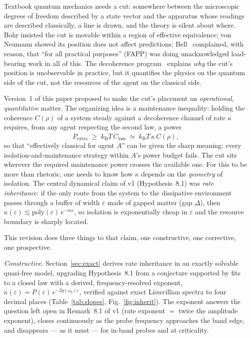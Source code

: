 \documentclass[11pt,a4paper]{article}
\theoremstyle{remark}
\newcommand{\eps}{\varepsilon}
\newcommand{\kB}{k_{\mathrm{B}}}
\begin{document}
Textbook quantum mechanics needs a cut: somewhere between the microscopic degrees of freedom
described by a state vector and the apparatus whose readings are described classically, a
line is drawn, and the theory is silent about where. Bohr insisted the cut is movable within
a region of effective equivalence; von Neumann showed its position does not affect
predictions; Bell~\cite{Bell1990} complained, with reason, that ``for all practical
purposes'' (FAPP) was doing unacknowledged load-bearing work in all of this. The decoherence
program~\cite{JoosZeh1985,Zurek2003RMP,Schlosshauer2004} explains \emph{why} the cut's
position is unobservable in practice, but it quantifies the physics on the quantum side of
the cut, not the resources of the agent on the classical side.

Version~1 of this paper proposed to make the cut's placement an \emph{operational,
quantitative} matter. The organizing idea is a maintenance inequality: holding the coherence
$C(\rho)$ of a system steady against a decoherence channel of rate $\kappa$ requires, from
any agent respecting the second law, a power
\begin{equation}
  P_{\mathrm{extra}} \;\geq\; \kB T\, \dot C_{\mathrm{loss}}
  \;\simeq\; \kB T\, \kappa\, C(\rho),
  \label{eq:maintenance}
\end{equation}
so that ``effectively classical for agent $A$'' can be given the sharp meaning: every
isolation-and-maintenance strategy within $A$'s power budget fails. The cut sits wherever
the required maintenance power crosses the available one. For this to be more than
rhetoric, one needs to know how $\kappa$ depends on the \emph{geometry} of isolation. The
central dynamical claim of v1 (Hypothesis~8.1) was \emph{rate inheritance}: if the only
route from the system to the dissipative environment passes through a buffer of width
$\eps$ made of gapped matter (gap $\Delta$), then
$\kappa(\eps) \lesssim \mathrm{poly}(\eps)\, e^{-m\eps}$, so isolation is exponentially
cheap in $\eps$ and the resource boundary is sharply located.

This revision does three things to that claim, one constructive, one corrective, one
prospective.

\emph{Constructive.} Section~\ref{sec:exact} derives rate inheritance in an exactly
solvable quasi-free model, upgrading Hypothesis~8.1 from a conjecture supported by fits to a closed
law with a derived, frequency-resolved exponent,
$\kappa(\eps) = P(\eps)\, e^{-2q(\omega_b)\eps}$, verified against exact Liouvillian
spectra to four decimal places (Table~\ref{tab:slopes}, Fig.~\ref{fig:inherit}). The
exponent answers the question left open in Remark~8.1 of v1 (rate exponent $=$ twice the
amplitude exponent), closes continuously as the probe frequency approaches the band edge,
and disappears --- as it must --- for in-band probes and at criticality.
\end{document}
